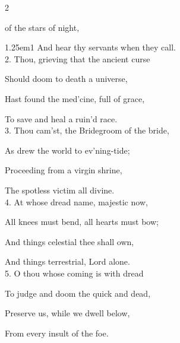 	\fancyhead[RO,LE]{}
	\fancyhead[RE,LO]{}
	

   \label{AdventI}


\firstEvensong\label{FirstAdventEvensong}


\firstEvensongHymn\label{FirstAdventEvensongHymn}

\begin{multicols}{2}
\sloppy

 of the stars of night,



\begin{hangparas}{1.25em}{1}
And hear thy servants when they call.\\

2. Thou, grieving that the ancient curse

Should doom to death a universe,

Hast found the med'cine, full of grace,

To save and heal a ruin'd race.\\

3. Thou cam'st, the Bridegroom of the bride,
 
As drew the world to ev'ning-tide;

Proceeding from a virgin shrine,

The spotless victim all divine.\\

4. At whose dread name, majestic now,

All knees must bend, all hearts must bow;

And things celestial thee shall own,

And things terrestrial, Lord alone.\\

5. O thou whose coming is with dread

To judge and doom the quick and dead,

Preserve us, while we dwell below,

From every insult of the foe.\\


\end{hangparas}
\end{multicols}
